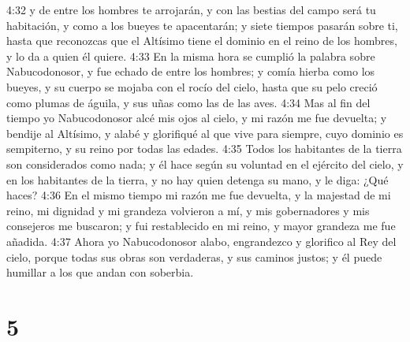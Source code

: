 4:32 y de entre los hombres te arrojarán, y con las bestias del campo será tu habitación, y como a los bueyes te apacentarán; y siete tiempos pasarán sobre ti, hasta que reconozcas que el Altísimo tiene el dominio en el reino de los hombres, y lo da a quien él quiere.  
4:33 En la misma hora se cumplió la palabra sobre Nabucodonosor, y fue echado de entre los hombres; y comía hierba como los bueyes, y su cuerpo se mojaba con el rocío del cielo, hasta que su pelo creció como plumas de águila, y sus uñas como las de las aves.  
4:34 Mas al fin del tiempo yo Nabucodonosor alcé mis ojos al cielo, y mi razón me fue devuelta; y bendije al Altísimo, y alabé y glorifiqué al que vive para siempre, cuyo dominio es sempiterno, y su reino por todas las edades.  
4:35 Todos los habitantes de la tierra son considerados como nada; y él hace según su voluntad en el ejército del cielo, y en los habitantes de la tierra, y no hay quien detenga su mano, y le diga: ¿Qué haces?  
4:36 En el mismo tiempo mi razón me fue devuelta, y la majestad de mi reino, mi dignidad y mi grandeza volvieron a mí, y mis gobernadores y mis consejeros me buscaron; y fui restablecido en mi reino, y mayor grandeza me fue añadida.  
4:37 Ahora yo Nabucodonosor alabo, engrandezco y glorifico al Rey del cielo, porque todas sus obras son verdaderas, y sus caminos justos; y él puede humillar a los que andan con soberbia.  

\chapter{5}

